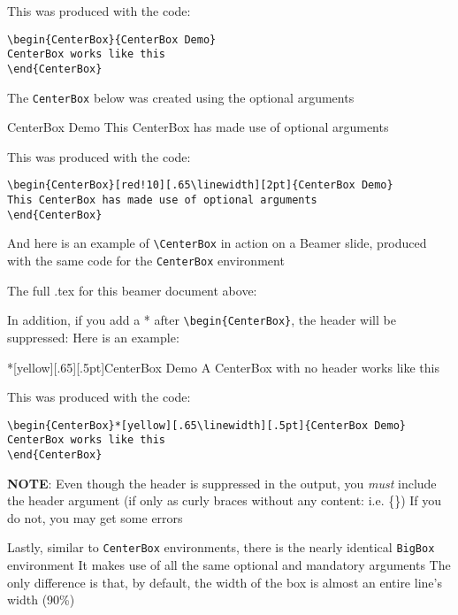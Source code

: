 \documentclass[11pt]{article}
\begin{document}
			\4 This was produced with the code:
				\5[]\begin{minipage}{.5\linewidth}
			\begin{verbatim}
\begin{CenterBox}{CenterBox Demo}
CenterBox works like this			
\end{CenterBox}
			\end{verbatim}	
\end{minipage}

	\2 The \verb+CenterBox+ below was created using the optional arguments
\begin{CenterBox}[red!10][.65\linewidth][2pt]{CenterBox Demo}
This CenterBox has made use of optional arguments
\end{CenterBox}
			\4 This was produced with the code:
				\5[]\begin{minipage}{.5\linewidth}
			\begin{verbatim}
\begin{CenterBox}[red!10][.65\linewidth][2pt]{CenterBox Demo}
This CenterBox has made use of optional arguments
\end{CenterBox}
			\end{verbatim}	
\end{minipage}


	\2 And here is an example of \verb+\CenterBox+ in action on a Beamer slide, produced with the same code for the \verb+CenterBox+ environment
		\begin{center}
		\end{center}
		
		\3 The full .tex for this beamer document above:
		\begin{center}
		\end{center}

\1 In addition, if you add a * after \verb+\begin{CenterBox}+, the header will be suppressed:
	\2 Here is an example:
		\begin{CenterBox}*[yellow][.65\linewidth][.5pt]{CenterBox Demo}
			A CenterBox with no header works like this			
		\end{CenterBox}
			\2 This was produced with the code:\\\begin{minipage}{.5\linewidth}
			\begin{verbatim}
\begin{CenterBox}*[yellow][.65\linewidth][.5pt]{CenterBox Demo}
CenterBox works like this			
\end{CenterBox}
			\end{verbatim}
			\end{minipage}
		\3 \textbf{NOTE}: Even though the header is suppressed in the output, you \textit{must} include the header argument (if only as curly braces without any content: i.e. \{\})
			\4 If you do not, you may get some errors

\1 Lastly, similar to \verb+CenterBox+ environments, there is the nearly identical \verb+BigBox+ environment
	\2 It makes use of all the same optional and mandatory arguments
	\2 The only difference is that, by default, the width of the box is almost an entire line's width (90\%)
\end{document}
